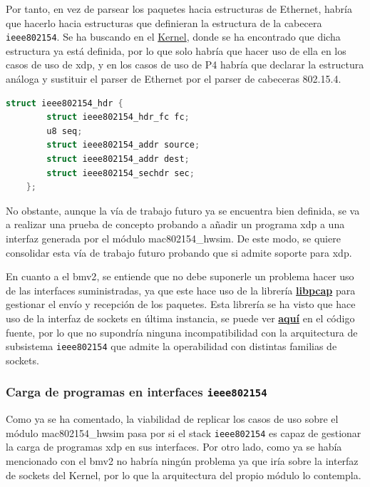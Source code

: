 Por tanto, en vez de parsear los paquetes hacia estructuras de Ethernet, habría que hacerlo hacia estructuras que definieran la estructura de la cabecera \texttt{ieee802154}. Se ha buscando en el \href{https://elixir.bootlin.com/linux/latest/source/include/net/ieee802154_netdev.h}{Kernel}, donde se ha encontrado que dicha estructura ya está definida, por lo que solo habría que hacer uso de ella en los casos de uso de \gls{xdp}, y en los casos de uso de P4 habría que declarar la estructura análoga y sustituir el parser de Ethernet por el parser de cabeceras 802.15.4. 

\begin{lstlisting}[language=C, style=C-color, caption={Estructura para manejar paquetes de l estándar ieee802154},label=code:futureW_ieee802154hdr]
    struct ieee802154_hdr {
    	struct ieee802154_hdr_fc fc;
    	u8 seq;
    	struct ieee802154_addr source;
    	struct ieee802154_addr dest;
    	struct ieee802154_sechdr sec;
    };
\end{lstlisting}

\vspace{0.5cm}
No obstante, aunque la vía de trabajo futuro ya se encuentra bien definida, se va a realizar una prueba de concepto probando a añadir un programa \gls{xdp} a una interfaz generada por el módulo mac802154\_hwsim. De este modo, se quiere consolidar esta vía de trabajo futuro probando que si admite soporte para \gls{xdp}.\\
\par
En cuanto a el \gls{bmv2}, se entiende que no debe suponerle un problema hacer uso de las interfaces suministradas, ya que este hace uso de la librería \href{https://github.com/p4lang/behavioral-model/blob/master/src/BMI/bmi_interface.c}{\textbf{libpcap}} para gestionar el envío y recepción de los paquetes. Esta librería se ha visto que hace uso de la interfaz de sockets en última instancia, se puede ver \href{https://github.com/the-tcpdump-group/libpcap/blob/master/pcap.c}{\textbf{aquí}} en el código fuente, por lo que no supondría ninguna incompatibilidad con la arquitectura de subsistema \texttt{ieee802154} que admite la operabilidad con distintas familias de sockets.


\subsubsection{Carga de programas  en interfaces \texttt{ieee802154}}

 Como ya se ha comentado, la viabilidad de replicar los casos de uso sobre el módulo mac802154\_hwsim pasa por si el stack \texttt{ieee802154} es capaz de gestionar la carga de programas \gls{xdp} en sus interfaces. Por otro lado, como ya se había mencionado con el \gls{bmv2} no habría ningún problema ya que iría sobre la interfaz de sockets del Kernel, por lo que la arquitectura del propio módulo lo contempla. \\
\par


